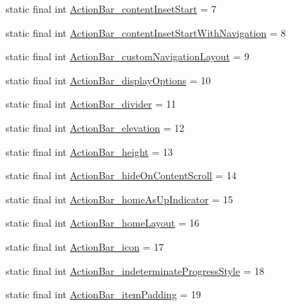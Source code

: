 \begin{DoxyCompactItemize}
\item 
static final int \mbox{\hyperlink{classandroid_1_1support_1_1design_1_1R_1_1styleable_abe343991a1e2e98a7183e8c6eebd614b}{Action\+Bar\+\_\+content\+Inset\+Start}} = 7
\item 
static final int \mbox{\hyperlink{classandroid_1_1support_1_1design_1_1R_1_1styleable_a27ded1b66c4b7c5d8c3a45644eba898f}{Action\+Bar\+\_\+content\+Inset\+Start\+With\+Navigation}} = 8
\item 
static final int \mbox{\hyperlink{classandroid_1_1support_1_1design_1_1R_1_1styleable_a7975163cf45e5585902650dd73ecd484}{Action\+Bar\+\_\+custom\+Navigation\+Layout}} = 9
\item 
static final int \mbox{\hyperlink{classandroid_1_1support_1_1design_1_1R_1_1styleable_a6f604fed60ddc6a45aa98849c31788bd}{Action\+Bar\+\_\+display\+Options}} = 10
\item 
static final int \mbox{\hyperlink{classandroid_1_1support_1_1design_1_1R_1_1styleable_aaf3a278fd3f4729132be824d0ccd6914}{Action\+Bar\+\_\+divider}} = 11
\item 
static final int \mbox{\hyperlink{classandroid_1_1support_1_1design_1_1R_1_1styleable_a23e7136e98075fbe16fdbf2b19080dc7}{Action\+Bar\+\_\+elevation}} = 12
\item 
static final int \mbox{\hyperlink{classandroid_1_1support_1_1design_1_1R_1_1styleable_a702cb201f72c8da487b2869a2bd86b42}{Action\+Bar\+\_\+height}} = 13
\item 
static final int \mbox{\hyperlink{classandroid_1_1support_1_1design_1_1R_1_1styleable_a261ec0d365bc8162f615ed81423a77e9}{Action\+Bar\+\_\+hide\+On\+Content\+Scroll}} = 14
\item 
static final int \mbox{\hyperlink{classandroid_1_1support_1_1design_1_1R_1_1styleable_a3010eaac8b9883587c5049e15ea710d4}{Action\+Bar\+\_\+home\+As\+Up\+Indicator}} = 15
\item 
static final int \mbox{\hyperlink{classandroid_1_1support_1_1design_1_1R_1_1styleable_aaa951a80ce9e4bbadcf2d03f00bd60b9}{Action\+Bar\+\_\+home\+Layout}} = 16
\item 
static final int \mbox{\hyperlink{classandroid_1_1support_1_1design_1_1R_1_1styleable_a28380a802fb7d59c57cd13a3ca1ffa00}{Action\+Bar\+\_\+icon}} = 17
\item 
static final int \mbox{\hyperlink{classandroid_1_1support_1_1design_1_1R_1_1styleable_a34717e6304c2b1241956a70a63b86248}{Action\+Bar\+\_\+indeterminate\+Progress\+Style}} = 18
\item 
static final int \mbox{\hyperlink{classandroid_1_1support_1_1design_1_1R_1_1styleable_aa4a6a8d1dc6b22f185af3d564ace3333}{Action\+Bar\+\_\+item\+Padding}} = 19

\end{DoxyCompactItemize}
